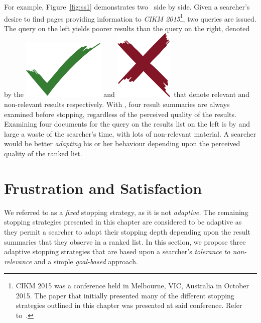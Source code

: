For example, Figure~\ref{fig:ss1} demonstrates two~ side by side. Given a searcher's desire to find pages providing information to \emph{CIKM 2015}\footnote{CIKM 2015 was a conference held in Melbourne, VIC, Australia in October 2015. The paper that initially presented many of the different stopping strategies outlined in this chapter was presented at said conference. Refer to~\cite{maxwell2015stopping_strategies}.}, two queries are issued. The query on the left yields poorer results than the query on the right, denoted by the \includegraphics[height=\fontcharht\font`\d]{figures/ch0-tick.pdf} and \includegraphics[height=\fontcharht\font`\d]{figures/ch0-cross.pdf} that denote relevant and non-relevant results respectively. With , four result summaries are always examined before stopping, regardless of the perceived quality of the results. Examining four documents for the query on the results list on the left is by and large a waste of the searcher's time, with lots of non-relevant material. A searcher would be better \emph{adapting} his or her behaviour depending upon the perceived quality of the ranked list.

\section{Frustration and Satisfaction}\label{sec:strategies:frus_disg}
We referred to  as a \emph{fixed} stopping strategy, as it is not \emph{adaptive.} The remaining stopping strategies presented in this chapter are considered to be adaptive as they permit a searcher to adapt their stopping depth depending upon the result summaries that they observe in a ranked list. In this section, we propose three adaptive stopping strategies that are based upon a searcher's \emph{tolerance to non-relevance} and a simple \emph{goal-based} approach.

